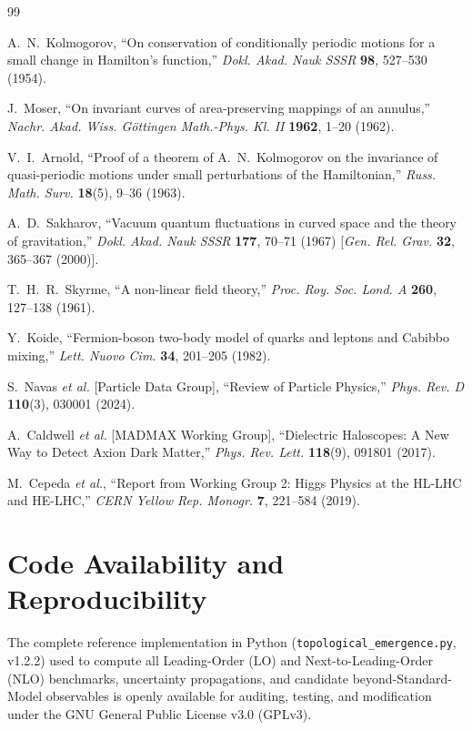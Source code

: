 \documentclass[11pt,a4paper]{article}
\begin{document}
\begin{thebibliography}{99}

A.~N.~Kolmogorov,
``On conservation of conditionally periodic motions for a small change in Hamilton's function,''
\textit{Dokl. Akad. Nauk SSSR} \textbf{98}, 527--530 (1954).

J.~Moser,
``On invariant curves of area-preserving mappings of an annulus,''
\textit{Nachr. Akad. Wiss. G\"ottingen Math.-Phys. Kl. II} \textbf{1962}, 1--20 (1962).

V.~I.~Arnold,
``Proof of a theorem of A.~N.~Kolmogorov on the invariance of quasi-periodic motions under small perturbations of the Hamiltonian,''
\textit{Russ. Math. Surv.} \textbf{18}(5), 9--36 (1963).

A.~D.~Sakharov,
``Vacuum quantum fluctuations in curved space and the theory of gravitation,''
\textit{Dokl. Akad. Nauk SSSR} \textbf{177}, 70--71 (1967)
[\textit{Gen. Rel. Grav.} \textbf{32}, 365--367 (2000)].

T.~H.~R.~Skyrme,
``A non-linear field theory,''
\textit{Proc. Roy. Soc. Lond. A} \textbf{260}, 127--138 (1961).

Y.~Koide,
``Fermion-boson two-body model of quarks and leptons and Cabibbo mixing,''
\textit{Lett. Nuovo Cim.} \textbf{34}, 201--205 (1982).

S.~Navas \textit{et al.} [Particle Data Group],
``Review of Particle Physics,''
\textit{Phys. Rev. D} \textbf{110}(3), 030001 (2024).

A.~Caldwell \textit{et al.} [MADMAX Working Group],
``Dielectric Haloscopes: A New Way to Detect Axion Dark Matter,''
\textit{Phys. Rev. Lett.} \textbf{118}(9), 091801 (2017).

M.~Cepeda \textit{et al.},
``Report from Working Group 2: Higgs Physics at the HL-LHC and HE-LHC,''
\textit{CERN Yellow Rep. Monogr.} \textbf{7}, 221--584 (2019).

\end{thebibliography}

\appendix
\section{Code Availability and Reproducibility}
The complete reference implementation in Python (\texttt{topological\_emergence.py}, v1.2.2) used to compute all Leading-Order (LO) and Next-to-Leading-Order (NLO) benchmarks, uncertainty propagations, and candidate beyond-Standard-Model observables is openly available for auditing, testing, and modification under the GNU General Public License v3.0 (GPLv3).
\end{document}
